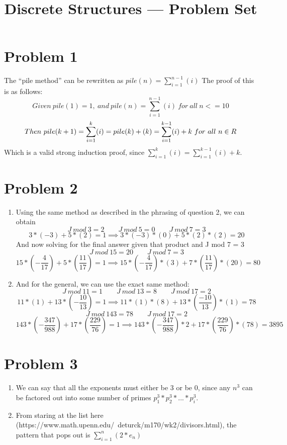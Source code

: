 \documentclass[11pt]{article}
\title{Discrete Structures --- Problem Set \Homework}
\author{\Name}
\date{}
\newenvironment{qparts}{\begin{enumerate}[{(}a{)}]}{\end{enumerate}}
\begin{document}
\maketitle

\section*{Problem 1}
The ``pile method'' can be rewritten as $pile(n) = \sum\limits_{i=1}^{n-1}(i)$ The proof of this is as follows:
\[ Given \ pile(1) = 1, \ and \ pile(n) = \sum\limits_{i=1}^{n-1}(i) \ for \ all \ n <= 10 \]
\[ Then \ pile(k+1) =  \sum\limits_{i=1}^{k}(i) = pile(k) + (k) = \sum\limits_{i=1}^{k-1}(i) + k \ for \ all \ n \in \\R \]
Which is a valid strong induction proof, since $ \sum\limits_{i=1}^{k}(i) = \sum\limits_{i=1}^{k-1}(i) + k$.

\section{Problem 2}
\begin{qparts}
\item
Using the same method as described in the phrasing of question 2, we can obtain
\[ J\ mod\ 3 = 2\qquad J\ mod\ 5=0\qquad J\ mod\ 7=3\]
\[ 3*(-3) + 5*(2) = 1 \implies 3*(-3)*(0) + 5 * (2) * (2) = 20 \]
And now solving for the final answer given that product and J mod 7 = 3
\[J\ mod\ 15=20\qquad J\ mod\ 7=3\]
\[ 15*(-\frac{4}{17}) + 5*(\frac{11}{17}) = 1 \implies 15*(-\frac{4}{17})*(3) + 7 * (\frac{11}{17}) * (20) = 80 \]

\item
And for the general, we can use the exact same method:
\[ J\ mod\ 11 = 1\qquad J\ mod\ 13=8\qquad J\ mod\ 17=2 \]
\[ 11*(1) + 13*(-\frac{10}{13}) = 1 \implies 11*(1)*(8) + 13*(\frac{-10}{13})*(1) = 78 \]
\[J\ mod\ 143=78\qquad J\ mod\ 17=2\]
\[ 143*(-\frac{347}{988}) + 17*(\frac{229}{76}) = 1 \implies 143*(-\frac{347}{988})*2 + 17*(\frac{229}{76})*(78) = 3895 \]

\end{qparts}

\section{Problem 3}
\begin{qparts}
\item
We can say that all the exponents must either be 3 or be 0, since any $n^3$ can be factored out into some number of primes $p_1^3 * p_2^3 * ... * p_i^3$.

\item
From staring at the list here (https://www.math.upenn.edu/~deturck/m170/wk2/divisors.html), the pattern that pops out is $\sum\limits_{i=1}^{n}(2*e_n)$

\end{qparts}
\end{document}

